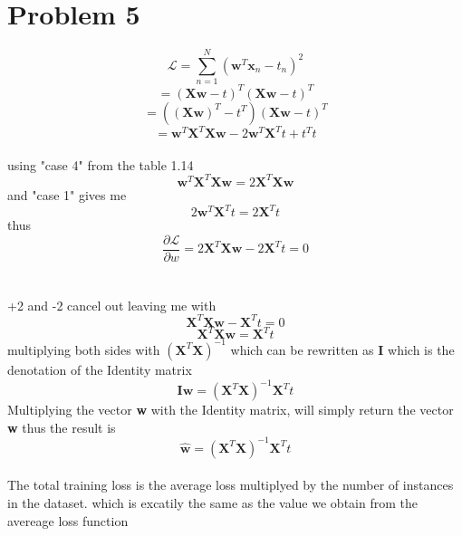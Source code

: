 \section{Problem 5}
$$ \mathcal{L} = \sum\limits_{n=1}^{N} (\mathbf{w}^{T} \mathbf{x}_{n} - t_{n})^2 $$ 
$$  = (\textbf{Xw}-t)^{T} (\textbf{Xw}-t)^{T} $$
$$  = ((\textbf{Xw})^{T} - t^{T}) (\textbf{Xw}-t)^{T} $$
$$  = \textbf{w}^{T} \textbf{X}^{T} \textbf{Xw} - 2\textbf{w}^{T}\textbf{X}^T t + t^{T}t $$
\\
using "case 4" from the table 1.14 
$$\textbf{w}^{T} \textbf{X}^{T} \textbf{Xw} = 2\textbf{X}^{T}\textbf{Xw} $$
and "case 1" gives me
$$2\textbf{w}^{T}\textbf{X}^Tt = 2\textbf{X}^{T} t$$
thus
$$\frac{\partial\mathcal{L}}{\partial w} = 2\textbf{X}^{T}\textbf{Xw} - 2\textbf{X}^{T} t = 0$$
\\
\\
+2 and -2 cancel out leaving me with 
$$ \textbf{X}^{T}\textbf{Xw} - \textbf{X}^{T} t = 0 $$
$$ \textbf{X}^{T}\textbf{Xw} = \textbf{X}^{T} t $$
multiplying both sides with $ (\textbf{X}^{T}\textbf{X})^{-1} $
which can be rewritten as \textbf{I} which is the denotation of the Identity matrix
$$ \textbf{I}\textbf{w} = (\textbf{X}^{T}\textbf{X})^{-1} \textbf{X}^{T} t $$
Multiplying the vector \textbf{w} with the Identity matrix, will simply return the vector \textbf{w} thus the result is
$$ \hat{\textbf{w}} = (\textbf{X}^{T}\textbf{X})^{-1} \textbf{X}^{T} t $$
\\
The total training loss is the average loss multiplyed by the number of instances in the dataset.  
which is excatily the same as the value we obtain from the avereage loss function